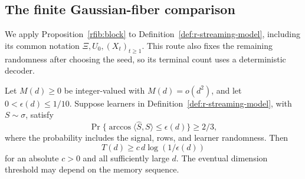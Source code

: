 \subsection{The finite Gaussian-fiber comparison}
\label{subsec:r-fiber-application}

We apply Proposition~\ref{rfib:block} to
Definition~\ref{def:r-streaming-model}, including its common notation
\(\Xi,U_0,(X_t)_{t\ge1}\).  This route also fixes the remaining
randomness after choosing the seed, so its terminal count uses a
deterministic decoder.

\begin{corollary}\label{rfib:streaming}
Let \(M(d)\ge0\) be integer-valued with \(M(d)=o(d^2)\), and let
\(0<\epsilon(d)\le1/10\).  Suppose learners in Definition~\ref{def:r-streaming-model},
with \(S\sim\sigma\), satisfy
\[
 \Pr\{\arccos\langle\widehat S,S\rangle\le\epsilon(d)\}\ge2/3,
\]
where the probability includes the signal, rows, and learner randomness.
Then
\[
 T(d)\ge c\,d\log(1/\epsilon(d))
\]
for an absolute \(c>0\) and all sufficiently large \(d\).  The
eventual dimension threshold may depend on the memory sequence.
\end{corollary}

